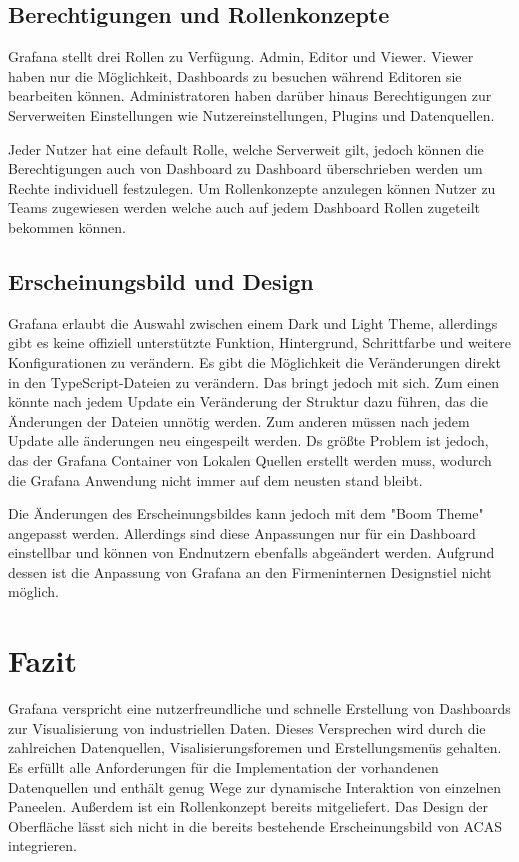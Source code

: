 \documentclass[a4paper, 12pt, oneside]{scrbook}
\begin{document}
	 \section{Berechtigungen und Rollenkonzepte}
	 
	 \noindent Grafana stellt drei Rollen zu Verfügung. Admin, Editor und Viewer. Viewer haben nur die Möglichkeit, Dashboards zu besuchen während Editoren sie bearbeiten können. Administratoren haben darüber hinaus Berechtigungen zur Serverweiten Einstellungen wie Nutzereinstellungen, Plugins und Datenquellen. 
	 	
	\noindent Jeder Nutzer hat eine default Rolle, welche Serverweit gilt, jedoch können die Berechtigungen auch von Dashboard zu Dashboard überschrieben werden um Rechte individuell festzulegen. Um Rollenkonzepte anzulegen können Nutzer zu Teams zugewiesen werden welche auch auf jedem Dashboard Rollen zugeteilt bekommen können. 
	 	
	\section{Erscheinungsbild und Design}
	 
	\noindent Grafana erlaubt die Auswahl zwischen einem Dark und Light Theme, allerdings gibt es keine offiziell unterstützte Funktion, Hintergrund, Schrittfarbe und weitere Konfigurationen zu verändern. Es gibt die Möglichkeit die Veränderungen direkt in den TypeScript-Dateien zu verändern. Das bringt jedoch mit sich. Zum einen könnte nach jedem Update ein Veränderung der Struktur dazu führen, das die Änderungen der Dateien unnötig werden. Zum anderen müssen nach jedem Update alle änderungen neu eingespeilt werden. Ds größte Problem ist jedoch, das der Grafana Container von Lokalen Quellen erstellt werden muss, wodurch die Grafana Anwendung nicht immer auf dem neusten stand bleibt.
	
	\noindent Die Änderungen des Erscheinungsbildes kann jedoch mit dem "Boom Theme" angepasst werden. Allerdings sind diese Anpassungen nur für ein Dashboard einstellbar und können von Endnutzern ebenfalls abgeändert werden. Aufgrund dessen ist die Anpassung von Grafana an den Firmeninternen Designstiel nicht möglich.
	
	\chapter{Fazit}
		
	\noindent Grafana verspricht eine nutzerfreundliche und schnelle Erstellung von Dashboards zur Visualisierung von industriellen Daten. Dieses Versprechen wird durch die zahlreichen Datenquellen, Visalisierungsforemen und Erstellungsmenüs gehalten. Es erfüllt alle Anforderungen für die Implementation der vorhandenen Datenquellen und enthält genug Wege zur dynamische Interaktion von einzelnen Paneelen. Außerdem ist ein Rollenkonzept bereits mitgeliefert. Das Design der Oberfläche lässt sich nicht in die bereits bestehende Erscheinungsbild von ACAS integrieren.

	
	\frontmatter
	\printbibliography
\end{document}
